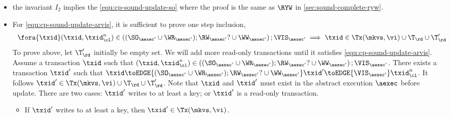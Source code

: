 \begin{itemize}
\item the invariant \( I_2 \) implies the \cref{equ:cp-sound-update-so} where the proof is the same as \( \RYW \) in \cref{sec:sound-complete-ryw}.

\item For \cref{equ:cp-sound-update-arvis}, it is sufficient to prove one step inclusion, \ie
\[
    \begin{array}{l}
    \fora{\txid} (\txid, \txid_\cl^n) \in \left( (\SO_{\aexec'} \cup \WR_{\aexec'} ) ; \RW_{\aexec'}? \cup \WW_{\aexec'} \right) ; \VIS_{\aexec'} 
    \implies \txid \in \Tx(\mkvs, \vi) \cup \T_\rd \cup \T'_\rd 
\end{array}
\]
To prove above, let \( \T'_\rd \) initially be empty set.
We will add more read-only transactions until it satisfies \cref{equ:cp-sound-update-arvis}.
Assume a transaction \( \txid \) such that 
\( (\txid, \txid_\cl^n) \in \left( (\SO_{\aexec'} \cup \WR_{\aexec'} ) ; \RW_{\aexec'}? \cup \WW_{\aexec'} \right) ; \VIS_{\aexec'}\).
There exists a transaction \( \txid' \) such that \( \txid \toEDGE{(\SO_{\aexec'} \cup \WR_{\aexec'} ) ; \RW_{\aexec'}? \cup \WW_{\aexec'}} \txid' \toEDGE{\VIS_{\aexec'}}  \txid_\cl^n \).
It follows \( \txid'  \in \Tx(\mkvs, \vi) \cup \T_\rd \cup \T'_\rd  \).
Note that \( \txid \) and \( \txid' \) must exist in the abstract execution \( \aexec \) before update.
There are two cases: \( \txid' \) writes to at least a key; or \( \txid' \) is a read-only transaction.
\begin{itemize}
    \item
    If \( \txid' \) writes to at least a key, then \( \txid' \in \Tx(\mkvs, \vi)\).

\end{itemize}
\end{itemize}
